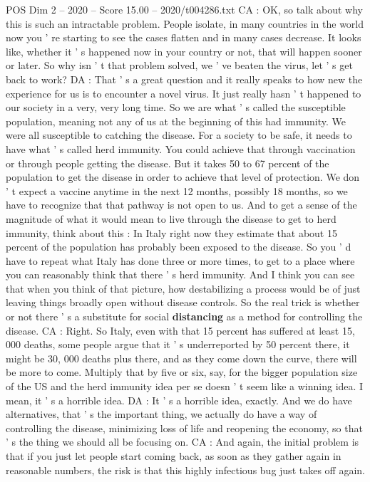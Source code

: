 \begin{textsample}{POS Dim 2 – 2020 – Score 15.00 – 2020/t004286.txt}
CA : OK, so talk about why this is such an intractable problem.
People isolate, in many countries in the world now you ' re starting to see the cases flatten and in many cases decrease.
It looks like, whether it ' s happened now in your country or not, that will happen sooner or later.
So why isn ' t that problem solved, we ' ve beaten the virus, let ' s get back to work?
DA : That ' s a great question and it really speaks to how new the experience for us is to encounter a novel virus.
It just really hasn ' t happened to our society in a very, very long time.
So we are what ' s called the susceptible population, meaning not any of us at the beginning of this had immunity.
We were all susceptible to catching the disease.
For a society to be safe, it needs to have what ' s called herd immunity.
You could achieve that through vaccination or through people getting the disease.
But it takes 50 to 67 percent of the population to get the disease in order to achieve that level of protection.
We don ' t expect a vaccine anytime in the next 12 months, possibly 18 months, so we have to recognize that that pathway is not open to us.
And to get a sense of the magnitude of what it would mean to live through the disease to get to herd immunity, think about this : In Italy right now they estimate that about 15 percent of the population has probably been exposed to the disease.
So you ' d have to repeat what Italy has done three or more times, to get to a place where you can reasonably think that there ' s herd immunity.
And I think you can see that when you think of that picture, how destabilizing a process would be of just leaving things broadly open without disease controls.
So the real trick is whether or not there ' s a substitute for social \textbf{distancing} as a method for controlling the disease.
CA : Right.
So Italy, even with that 15 percent has suffered at least 15, 000 deaths, some people argue that it ' s underreported by 50 percent there, it might be 30, 000 deaths plus there, and as they come down the curve, there will be more to come.
Multiply that by five or six, say, for the bigger population size of the US and the herd immunity idea per se doesn ' t seem like a winning idea.
I mean, it ' s a horrible idea.
DA : It ' s a horrible idea, exactly.
And we do have alternatives, that ' s the important thing, we actually do have a way of controlling the disease, minimizing loss of life and reopening the economy, so that ' s the thing we should all be focusing on.
CA : And again, the initial problem is that if you just let people start coming back, as soon as they gather again in reasonable numbers, the risk is that this highly infectious bug just takes off again.

\end{textsample}
